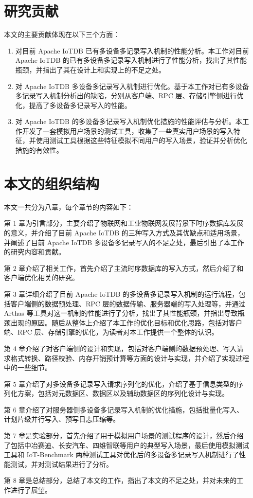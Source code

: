 \section{研究贡献}
本文的主要贡献体现在以下三个方面：
\begin{enumerate}
  \item 对目前 Apache IoTDB 已有多设备多记录写入机制的性能分析。本工作对目前 Apache IoTDB 的已有多设备多记录写入机制进行了性能分析，找出了其性能瓶颈，并指出了其在设计上和实现上的不足之处。
  \item 对 Apache IoTDB 多设备多记录写入机制进行优化。基于本工作对已有多设备多记录写入机制分析出的缺陷，分别从客户端、RPC 层、存储引擎侧进行优化，提高了多设备多记录写入的性能。
  \item 对 Apache IoTDB 的多设备多记录写入机制优化措施的性能评估与分析。本工作开发了一套模拟用户场景的测试工具，收集了一些真实用户场景的写入特征，并使用测试工具根据这些特征模拟不同用户的写入场景，验证并分析优化措施的有效性。
\end{enumerate}

\section{本文的组织结构}

本文一共分为八章，每个章节的内容如下：

第 1 章为引言部分，主要介绍了物联网和工业物联网发展背景下时序数据库发展的意义，并介绍了目前 Apache IoTDB 的三种写入方式及其优缺点和适用场景，并阐述了目前 Apache IoTDB 多设备多记录写入的不足之处，最后引出了本工作的研究内容和贡献。

第 2 章介绍了相关工作，首先介绍了主流时序数据库的写入方式，然后介绍了和客户端优化相关的研究。

第 3 章详细介绍了目前 Apache IoTDB 的多设备多记录写入机制的运行流程，包括客户端侧的数据预处理、RPC 层的数据传输、服务器端的写入处理等，并通过 Arthas 等工具对这一机制的性能进行了分析，找出了其性能瓶颈，并指出导致瓶颈出现的原因。随后从整体上介绍了本工作的优化目标和优化思路，包括对客户端、RPC 层、存储引擎的优化，为读者对本工作提供一个整体的认识。

第 4 章介绍了对客户端侧的设计和实现，包括对客户端侧的数据预处理、写入请求格式转换、路径校验、内存开销预计算等方面的设计与实现，并介绍了实现过程中的一些细节。

第 5 章介绍了对多设备多记录写入请求序列化的优化，介绍了基于信息类型的序列化方案，包括对元数据区、数据区以及辅助数据区的序列化设计与实现。

第 6 章介绍了对服务器侧多设备多记录写入机制的优化措施，包括批量化写入、计划片级并行写入、预写日志压缩等。

第 7 章是实验部分，首先介绍了用于模拟用户场景的测试程序的设计，然后介绍了包括中冶赛迪、长安汽车、四维智联等用户的典型写入场景，最后使用模拟测试工具和 IoT-Benchmark\cite{liu2019benchmarking} 两种测试工具对优化后的多设备多记录写入机制进行了性能测试，并对测试结果进行了分析。

第 8 章是总结部分，总结了本文的工作，指出了本文的不足之处，并对未来的工作进行了展望。